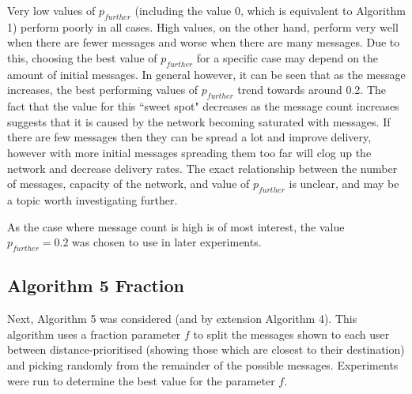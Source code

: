 \documentclass[bsc,frontabs,twoside,singlespacing,parskip,deptreport]{infthesis}     %
\begin{document}
Very low values of $p_{further}$ (including the value 0, which is equivalent to Algorithm 1) perform poorly in all cases. High values, on the other hand, perform very well when there are fewer messages and worse when there are many messages. Due to this, choosing the best value of $p_{further}$ for a specific case may depend on the amount of initial messages. In general however, it can be seen that as the message increases, the best performing values of $p_{further}$ trend towards around 0.2. The fact that the value for this ``sweet spot" decreases as the message count increases suggests that it is caused by the network becoming saturated with messages. If there are few messages then they can be spread a lot and improve delivery, however with more initial messages spreading them too far will clog up the network and decrease delivery rates. The exact relationship between the number of messages, capacity of the network, and value of $p_{further}$ is unclear, and may be a topic worth investigating further.

As the case where message count is high is of most interest, the value $p_{further}=0.2$ was chosen to use in later experiments.


\subsection{Algorithm 5 Fraction}  \label{subsec:algorithm_5_fraction}
Next, Algorithm 5 was considered (and by extension Algorithm 4). This algorithm uses a fraction parameter $f$ to split the messages shown to each user between distance-prioritised (showing those which are closest to their destination) and picking randomly from the remainder of the possible messages. Experiments were run to determine the best value for the parameter $f$.
\end{document}

